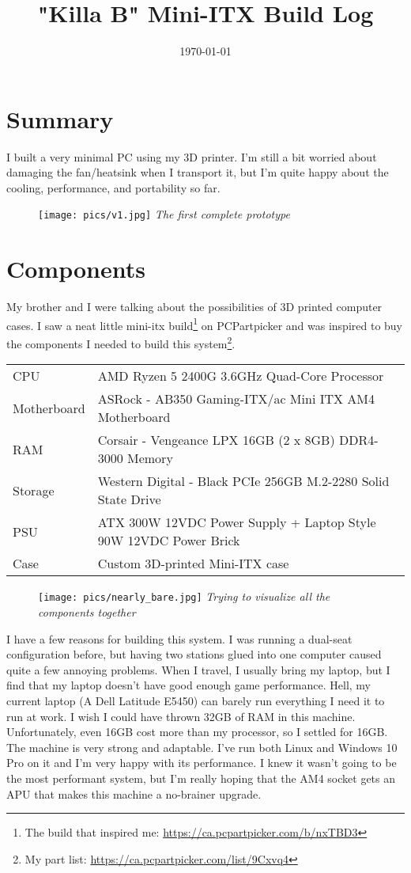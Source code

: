 \documentclass{article}
\title{\textbf{"Killa B" Mini-ITX Build Log}}
\author{}
\date{\today}
\begin{document}
\maketitle

\section{Summary}
I built a very minimal PC using my 3D printer. I'm still a bit worried about damaging the fan/heatsink when I transport it, but I'm quite happy about the cooling, performance, and portability so far.
\begin{figure}[h]
\texttt{[image: pics/v1.jpg]}
\emph{The first complete prototype}
\end{figure}

\section{Components}
My brother and I were talking about the possibilities of 3D printed computer cases. I saw a neat little mini-itx build\footnote{The build that inspired me: \url{https://ca.pcpartpicker.com/b/nxTBD3}} on PCPartpicker and was inspired to buy the components I needed to build this system\footnote{My part list: \url{https://ca.pcpartpicker.com/list/9Cxvq4}}.
\begin{center}
\begin{tabular}{ l l }
 CPU & AMD Ryzen 5 2400G 3.6GHz Quad-Core Processor \\  
 Motherboard & ASRock - AB350 Gaming-ITX/ac Mini ITX AM4 Motherboard \\  
 RAM & Corsair - Vengeance LPX 16GB (2 x 8GB) DDR4-3000 Memory \\
 Storage & Western Digital - Black PCIe 256GB M.2-2280 Solid State Drive \\
 PSU & ATX 300W 12VDC Power Supply + Laptop Style 90W 12VDC Power Brick \\
 Case & Custom 3D-printed  Mini-ITX case \\
\end{tabular}
\end{center}

\begin{figure}[h]
\texttt{[image: pics/nearly\_bare.jpg]}
\emph{Trying to visualize all the components together}
\end{figure}

I have a few reasons for building this system. I was running a dual-seat configuration before, but having two stations glued into one computer caused quite a few annoying problems. When I travel, I usually bring my laptop, but I find that my laptop doesn't have good enough game performance. Hell, my current laptop (A Dell Latitude E5450) can barely run everything I need it to run at work.
I wish I could have thrown 32GB of RAM in this machine. Unfortunately, even 16GB cost more than my processor, so I settled for 16GB. The machine is very strong and adaptable. I've run both Linux and Windows 10 Pro on it and I'm very happy with its  performance. I knew it wasn't going to be the most performant system, but I'm really hoping that the AM4 socket gets an APU that makes this machine a no-brainer upgrade. 
\end{document}
